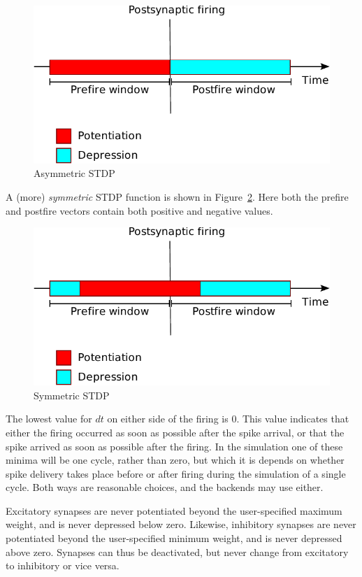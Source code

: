 \documentclass[a4paper]{article}
\begin{document}
\begin{figure}[ht]
	\centering\includegraphics[width=.8\textwidth]{figures/stdp/asymmetric}
	\caption{Asymmetric STDP}
	\label{fig:asymmetric}
\end{figure}

A (more) \emph{symmetric} STDP function is shown in Figure~\ref{fig:symmetric}.  
Here both the prefire and postfire vectors contain both positive and negative values.

\begin{figure}
	\centering\includegraphics[width=.8\textwidth]{figures/stdp/symmetric}
	\caption{Symmetric STDP}
	\label{fig:symmetric}
\end{figure}

The lowest value for $dt$ on either side of the firing is 0. 
This value indicates that either the firing occurred as soon as possible after the spike
arrival, 
	or that the spike arrived as soon as possible after the firing. 
In the simulation one of these minima will be one cycle,
	rather than zero, but which it is depends on whether spike delivery takes place before or after firing during
the simulation of a single cycle. 
Both ways are reasonable choices, and the backends may use either.

Excitatory synapses are never potentiated beyond the user-specified maximum weight,
	and is never depressed below zero.
Likewise, inhibitory synapses are never potentiated beyond the  user-specified minimum weight,
	and is never depressed above zero.
Synapses can thus be deactivated, but never change from excitatory to inhibitory or vice versa.
\end{document}
